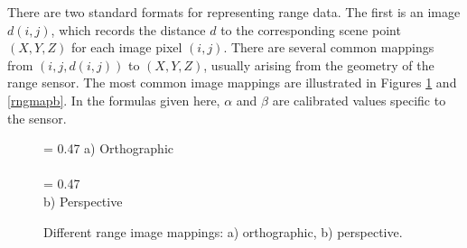 \documentclass[twocolumn,oneside]{book}
\begin{document}
There are two standard formats for representing range data.
The first is an image $d(i,j)$, which records the distance $d$ to the
corresponding scene point $(X,Y,Z)$ for each image pixel $(i,j)$.
There are several common mappings from $(i,j,d(i,j))$ to $(X,Y,Z)$,
usually arising from the geometry of the range sensor.
The most common image mappings are illustrated in Figures \ref{rngmapa} and
\ref{rngmapb}.
In the formulas given here,
$\alpha$ and $\beta$ are calibrated values specific to the sensor.
\begin{figure}[htb]
{\epsfxsize = 0.47\textwidth {}}
a) Orthographic\\
\ \\
{\epsfxsize = 0.47\textwidth {}}\\
b) Perspective
\caption{Different range image mappings: a) orthographic, b) perspective.
\label{rngmapa}}
\end{figure}
\end{document}
